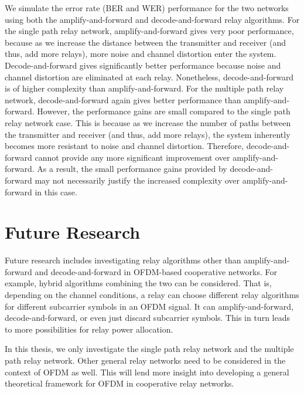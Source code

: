 We simulate the error rate (BER and WER) performance for the two networks using both the amplify-and-forward and decode-and-forward relay algorithms.  For the single path relay network, amplify-and-forward gives very poor performance, because as we increase the distance between the transmitter and receiver (and thus, add more relays), more noise and channel distortion enter the system.  Decode-and-forward gives significantly better performance because noise and channel distortion are eliminated at each relay.  Nonetheless, decode-and-forward is of higher complexity than amplify-and-forward.  For the multiple path relay network, decode-and-forward again gives better performance than amplify-and-forward.  However, the performance gains are small compared to the single path relay network case.  This is because as we increase the number of paths between the transmitter and receiver (and thus, add more relays), the system inherently becomes more resistant to noise and channel distortion.  Therefore, decode-and-forward cannot provide any more significant improvement over amplify-and-forward.  As a result, the small performance gains provided by decode-and-forward may not necessarily justify the increased complexity over amplify-and-forward in this case.

\section{Future Research}
Future research includes investigating relay algorithms other than amplify-and-forward and decode-and-forward in OFDM-based cooperative networks.  For example, hybrid algorithms combining the two can be considered.  That is, depending on the channel conditions, a relay can choose different relay algorithms for different subcarrier symbols in an OFDM signal.  It can amplify-and-forward, decode-and-forward, or even just discard subcarrier symbols.  This in turn leads to more possibilities for relay power allocation.

In this thesis, we only investigate the single path relay network and the multiple path relay network.  Other general relay networks need to be considered in the context of OFDM as well.  This will lend more insight into developing a general theoretical framework for OFDM in cooperative relay networks.

